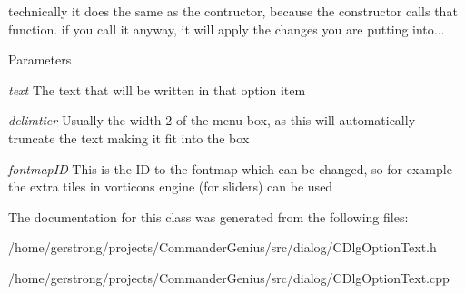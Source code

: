 technically it does the same as the contructor, because the constructor calls that function. if you call it anyway, it will apply the changes you are putting into... 


\begin{DoxyParams}{Parameters}
\item[{\em text}]The text that will be written in that option item \item[{\em delimtier}]Usually the width-\/2 of the menu box, as this will automatically truncate the text making it fit into the box \item[{\em fontmapID}]This is the ID to the fontmap which can be changed, so for example the extra tiles in vorticons engine (for sliders) can be used \end{DoxyParams}


The documentation for this class was generated from the following files:\begin{DoxyCompactItemize}
\item 
/home/gerstrong/projects/CommanderGenius/src/dialog/CDlgOptionText.h\item 
/home/gerstrong/projects/CommanderGenius/src/dialog/CDlgOptionText.cpp\end{DoxyCompactItemize}
